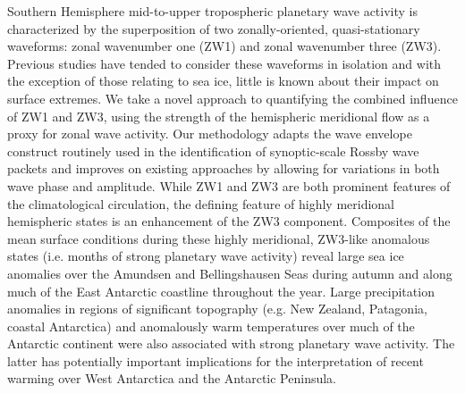 Southern Hemisphere mid-to-upper tropospheric planetary wave activity is characterized by the superposition of two zonally-oriented, quasi-stationary waveforms: zonal wavenumber one (ZW1) and zonal wavenumber three (ZW3). Previous studies have tended to consider these waveforms in isolation and with the exception of those relating to sea ice, little is known about their impact on surface extremes. We take a novel approach to quantifying the combined influence of ZW1 and ZW3, using the strength of the hemispheric meridional flow as a proxy for zonal wave activity. Our methodology adapts the wave envelope construct routinely used in the identification of synoptic-scale Rossby wave packets and improves on existing approaches by allowing for variations in both wave phase and amplitude. While ZW1 and ZW3 are both prominent features of the climatological circulation, the defining feature of highly meridional hemispheric states is an enhancement of the ZW3 component. Composites of the mean surface conditions during these highly meridional, ZW3-like anomalous states (i.e. months of strong planetary wave activity) reveal large sea ice anomalies over the Amundsen and Bellingshausen Seas during autumn and along much of the East Antarctic coastline throughout the year. Large precipitation anomalies in regions of significant topography (e.g. New Zealand, Patagonia, coastal Antarctica) and anomalously warm temperatures over much of the Antarctic continent were also associated with strong planetary wave activity. The latter has potentially important implications for the interpretation of recent warming over West Antarctica and the Antarctic Peninsula.
